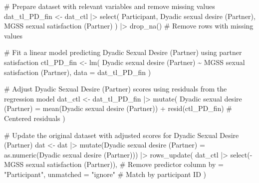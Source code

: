\documentclass[
  bookmarksnumbered]{article}
\newenvironment{Shaded}{\begin{snugshade}}{\end{snugshade}}
\newcommand{\AttributeTok}[1]{\textcolor[rgb]{0.80,0.80,0.80}{#1}}
\newcommand{\CommentTok}[1]{\textcolor[rgb]{0.50,0.62,0.50}{#1}}
\newcommand{\FunctionTok}[1]{\textcolor[rgb]{0.94,0.94,0.56}{#1}}
\newcommand{\NormalTok}[1]{\textcolor[rgb]{0.80,0.80,0.80}{#1}}
\newcommand{\OtherTok}[1]{\textcolor[rgb]{0.94,0.94,0.56}{#1}}
\newcommand{\SpecialCharTok}[1]{\textcolor[rgb]{0.86,0.64,0.64}{#1}}
\newcommand{\StringTok}[1]{\textcolor[rgb]{0.80,0.58,0.58}{#1}}
\begin{document}
\begin{Shaded}
\begin{Highlighting}[]
\CommentTok{\# Prepare dataset with relevant variables and remove missing values}
\NormalTok{dat\_tl\_PD\_fin }\OtherTok{\textless{}{-}}\NormalTok{ dat\_ctl }\SpecialCharTok{|\textgreater{}}
  \FunctionTok{select}\NormalTok{(}
\NormalTok{    Participant, }\StringTok{\textasciigrave{}}\AttributeTok{Dyadic sexual desire (Partner)}\StringTok{\textasciigrave{}}\NormalTok{, }\StringTok{\textasciigrave{}}\AttributeTok{MGSS sexual satisfaction (Partner)}\StringTok{\textasciigrave{}}
\NormalTok{  ) }\SpecialCharTok{|\textgreater{}}
  \FunctionTok{drop\_na}\NormalTok{() }\CommentTok{\# Remove rows with missing values}

\CommentTok{\# Fit a linear model predicting Dyadic Sexual Desire (Partner) using partner satisfaction}
\NormalTok{ctl\_PD\_fin }\OtherTok{\textless{}{-}} \FunctionTok{lm}\NormalTok{(}
  \StringTok{\textasciigrave{}}\AttributeTok{Dyadic sexual desire (Partner)}\StringTok{\textasciigrave{}} \SpecialCharTok{\textasciitilde{}} \StringTok{\textasciigrave{}}\AttributeTok{MGSS sexual satisfaction (Partner)}\StringTok{\textasciigrave{}}\NormalTok{,}
  \AttributeTok{data =}\NormalTok{ dat\_tl\_PD\_fin}
\NormalTok{)}

\CommentTok{\# Adjust Dyadic Sexual Desire (Partner) scores using residuals from the regression model}
\NormalTok{dat\_ctl }\OtherTok{\textless{}{-}}\NormalTok{ dat\_tl\_PD\_fin }\SpecialCharTok{|\textgreater{}}
  \FunctionTok{mutate}\NormalTok{(}
    \StringTok{\textasciigrave{}}\AttributeTok{Dyadic sexual desire (Partner)}\StringTok{\textasciigrave{}} \OtherTok{=}
      \FunctionTok{mean}\NormalTok{(}\StringTok{\textasciigrave{}}\AttributeTok{Dyadic sexual desire (Partner)}\StringTok{\textasciigrave{}}\NormalTok{) }\SpecialCharTok{+} \FunctionTok{resid}\NormalTok{(ctl\_PD\_fin) }\CommentTok{\# Centered residuals}
\NormalTok{  )}

\CommentTok{\# Update the original dataset with adjusted scores for Dyadic Sexual Desire (Partner)}
\NormalTok{dat }\OtherTok{\textless{}{-}}\NormalTok{ dat }\SpecialCharTok{|\textgreater{}}
  \FunctionTok{mutate}\NormalTok{(}\StringTok{\textasciigrave{}}\AttributeTok{Dyadic sexual desire (Partner)}\StringTok{\textasciigrave{}} \OtherTok{=} \FunctionTok{as.numeric}\NormalTok{(}\StringTok{\textasciigrave{}}\AttributeTok{Dyadic sexual desire (Partner)}\StringTok{\textasciigrave{}}\NormalTok{)) }\SpecialCharTok{|\textgreater{}}
  \FunctionTok{rows\_update}\NormalTok{(}
\NormalTok{    dat\_ctl }\SpecialCharTok{|\textgreater{}} \FunctionTok{select}\NormalTok{(}\SpecialCharTok{{-}}\StringTok{\textasciigrave{}}\AttributeTok{MGSS sexual satisfaction (Partner)}\StringTok{\textasciigrave{}}\NormalTok{), }\CommentTok{\# Remove predictor column}
    \AttributeTok{by =} \StringTok{"Participant"}\NormalTok{, }\AttributeTok{unmatched =} \StringTok{"ignore"} \CommentTok{\# Match by participant ID}
\NormalTok{  )}
\end{Highlighting}
\end{Shaded}
\end{document}
